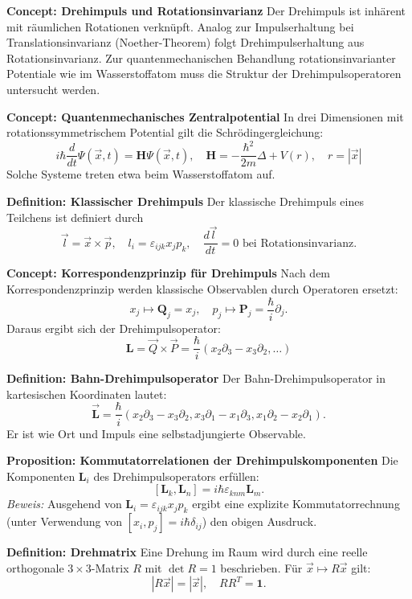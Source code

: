 \documentclass[10pt, letterpaper]{article}
\begin{document}
\textbf{Concept: Drehimpuls und Rotationsinvarianz}  
Der Drehimpuls ist inhärent mit räumlichen Rotationen verknüpft. Analog zur Impulserhaltung bei Translationsinvarianz (Noether-Theorem) folgt Drehimpulserhaltung aus Rotationsinvarianz. Zur quantenmechanischen Behandlung rotationsinvarianter Potentiale wie im Wasserstoffatom muss die Struktur der Drehimpulsoperatoren untersucht werden.


\textbf{Concept: Quantenmechanisches Zentralpotential}  
In drei Dimensionen mit rotationssymmetrischem Potential gilt die Schrödingergleichung:  
$$
i \hbar \frac{d}{d t} \Psi(\vec{x}, t)=\mathbf{H} \Psi(\vec{x}, t), \quad \mathbf{H}=-\frac{\hbar^{2}}{2 m} \Delta+V(r), \quad r=|\vec{x}|
$$  
Solche Systeme treten etwa beim Wasserstoffatom auf.


\textbf{Definition: Klassischer Drehimpuls}  
Der klassische Drehimpuls eines Teilchens ist definiert durch  
$$
\vec{l} = \vec{x} \times \vec{p}, \quad l_i = \varepsilon_{ijk} x_j p_k, \quad \frac{d\vec{l}}{dt} = 0 \text{ bei Rotationsinvarianz}.
$$


\textbf{Concept: Korrespondenzprinzip für Drehimpuls}  
Nach dem Korrespondenzprinzip werden klassische Observablen durch Operatoren ersetzt:
$$
x_j \mapsto \mathbf{Q}_j = x_j, \quad p_j \mapsto \mathbf{P}_j = \frac{\hbar}{i} \partial_j.
$$
Daraus ergibt sich der Drehimpulsoperator:  
$$
\mathbf{L} = \vec{Q} \times \vec{P} = \frac{\hbar}{i} (x_2 \partial_3 - x_3 \partial_2, \dots)
$$


\textbf{Definition: Bahn-Drehimpulsoperator}  
Der Bahn-Drehimpulsoperator in kartesischen Koordinaten lautet:  
$$
\overrightarrow{\mathbf{L}} = \frac{\hbar}{i}(x_2 \partial_3 - x_3 \partial_2, x_3 \partial_1 - x_1 \partial_3, x_1 \partial_2 - x_2 \partial_1).
$$
Er ist wie Ort und Impuls eine selbstadjungierte Observable.


\textbf{Proposition: Kommutatorrelationen der Drehimpulskomponenten}  
Die Komponenten $\mathbf{L}_i$ des Drehimpulsoperators erfüllen:
$$
[\mathbf{L}_k, \mathbf{L}_n] = i \hbar \varepsilon_{knm} \mathbf{L}_m.
$$  
\textit{Beweis:} Ausgehend von $\mathbf{L}_i = \varepsilon_{ijk} x_j p_k$ ergibt eine explizite Kommutatorrechnung (unter Verwendung von $[x_i, p_j] = i \hbar \delta_{ij}$) den obigen Ausdruck.


\textbf{Definition: Drehmatrix}  
Eine Drehung im Raum wird durch eine reelle orthogonale $3 \times 3$-Matrix $R$ mit $\det R = 1$ beschrieben. Für $\vec{x} \mapsto R \vec{x}$ gilt:  
$$
|R \vec{x}| = |\vec{x}|, \quad R R^T = \mathbf{1}.
$$
\end{document}
